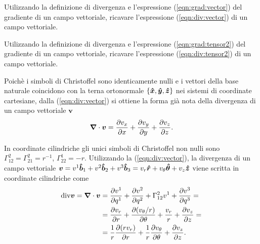 \begin{exercise}
 Utilizzando la definizione di divergenza e l'espressione (\ref{eqn:grad:vector}) del gradiente di un campo vettoriale, ricavare l'espressione (\ref{eqn:div:vector}) di un campo vettoriale.
\end{exercise}
\begin{exercise}
 Utilizzando la definizione di divergenza e l'espressione (\ref{eqn:grad:tensor2}) del gradiente di un campo vettoriale, ricavare l'espressione (\ref{eqn:div:tensor2}) di un campo vettoriale.
\end{exercise}

\begin{example}
 Poichè i simboli di Christoffel sono identicamente nulli e i vettori della base naturale coincidono con la terna ortonormale $\{ \bm{\hat{x}}, \bm{\hat{y}}, \bm{\hat{z}}\}$ nei sistemi di coordinate cartesiane, dalla (\ref{eqn:div:vector}) si ottiene la forma già nota della divergenza di un campo vettoriale $\bm{v}$ 
\begin{equation}
 \bm{\nabla} \cdot \bm{v} = \dfrac{\partial v_x}{\partial x} + \dfrac{\partial v_y}{\partial y} + \dfrac{\partial v_z}{\partial z}.
\end{equation}
\end{example}
\begin{example}
In coordinate cilindriche gli unici simboli di Christoffel non nulli sono $\Gamma^2_{12} = \Gamma^2_{21} = r^{-1}$, $\Gamma^1_{22} = -r$. Utilizzando la (\ref{eqn:div:vector}), la divergenza di un campo vettoriale $\bm{v} = v^1 \bm{\hat{b}}_1 + v^2 \bm{\hat{b}}_2 + v^3 \bm{\hat{b}}_3 = v_r \bm{\hat{r}} + v_{\theta} \bm{\hat{\theta}} + v_z \bm{\hat{z}}$ viene scritta in coordinate cilindriche come
\begin{equation}
\begin{aligned}
 \text{div} \bm{v} = \bm{\nabla} \cdot \bm{v} & =
  \dfrac{\partial v^1}{\partial q^1} + \dfrac{\partial v^2}{\partial q^2} + \Gamma_{12}^2 v^1 + \dfrac{\partial v^3}{\partial q^3} = \\
  & = \dfrac{\partial v_r}{\partial r} + \dfrac{\partial  (v_{\theta}/r) }{\partial \theta} + \dfrac{v_r}{r} + \dfrac{\partial v_z}{\partial z} = \\	
  & = \dfrac{1}{r}\dfrac{\partial ( r v_r)}{\partial r} + \dfrac{1}{r}\dfrac{\partial v_{\theta}}{\partial \theta} + \dfrac{\partial v_z}{\partial z}.
\end{aligned}
\end{equation}
\end{example}

